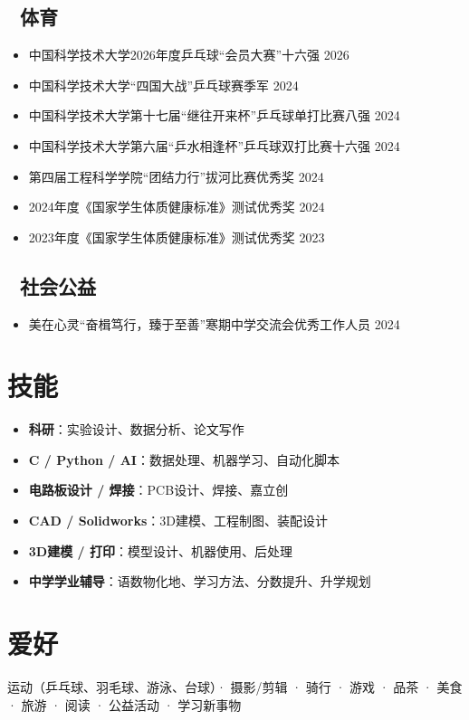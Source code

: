\documentclass[11pt,a4paper]{article}
\begin{document}
\subsection*{🏓 体育}
\begin{itemize}
  \item 中国科学技术大学2026年度乒乓球“会员大赛”十六强 \hfill 2026
  \item 中国科学技术大学“四国大战”乒乓球赛季军 \hfill 2024
  \item 中国科学技术大学第十七届“继往开来杯”乒乓球单打比赛八强 \hfill 2024
  \item 中国科学技术大学第六届“乒水相逢杯”乒乓球双打比赛十六强 \hfill 2024
  \item 第四届工程科学学院“团结力行”拔河比赛优秀奖 \hfill 2024
  \item 2024年度《国家学生体质健康标准》测试优秀奖 \hfill 2024
  \item 2023年度《国家学生体质健康标准》测试优秀奖 \hfill 2023
\end{itemize}

\subsection*{🤝 社会公益}
\begin{itemize}
  \item 美在心灵“奋楫笃行，臻于至善”寒期中学交流会优秀工作人员 \hfill 2024
\end{itemize}

\section{技能}
\begin{itemize}
  \item \textbf{科研}：实验设计、数据分析、论文写作
  \item \textbf{C / Python / AI}：数据处理、机器学习、自动化脚本
  \item \textbf{电路板设计 / 焊接}：PCB设计、焊接、嘉立创
  \item \textbf{CAD / Solidworks}：3D建模、工程制图、装配设计
  \item \textbf{3D建模 / 打印}：模型设计、机器使用、后处理
  \item \textbf{中学学业辅导}：语数物化地、学习方法、分数提升、升学规划
\end{itemize}

\section{爱好}
运动（乒乓球、羽毛球、游泳、台球）· 摄影/剪辑 · 骑行 · 游戏 · 品茶 · 美食 · 旅游 · 阅读 · 公益活动 · 学习新事物
\end{document}
